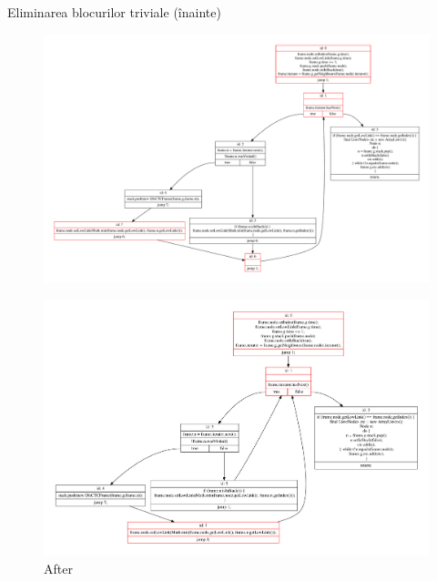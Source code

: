\documentclass{beamer}
\begin{document}
\begin{frame}{Eliminarea blocurilor triviale (înainte)}
    \begin{figure}[htb]
        \centering
        \includegraphics[width=\linewidth]{../../../theses/diploma/src/graph/trivial-before.pdf}
    \end{figure}
    \begin{figure}[htb]
        \centering
        \includegraphics[width=\linewidth]{../../../theses/diploma/src/graph/trivial-after.pdf}
        \caption{After}
    \end{figure}
\end{frame}
\end{document}
